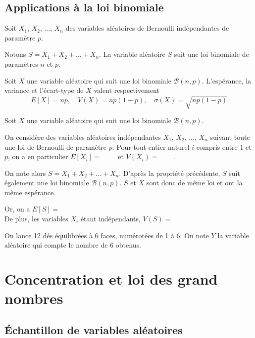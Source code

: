 \documentclass[11pt,fleqn, openany]{book} %
\begin{document}
\subsection{Applications à la loi binomiale}

\begin{proposition} Soit $X_1$, $X_2$, ..., $X_n$ des variables aléatoires de Bernoulli indépendantes de paramètre $p$. 

Notons $S=X_1+X_2+\ldots + X_n$. La variable aléatoire $S$ suit une loi binomiale de paramètres $n$ et $p$.\end{proposition}


\begin{proposition}Soit $X$ une variable aléatoire qui suit une loi binomiale $\mathcal{B}(n,p)$. L'espérance, la variance et l'écart-type de $X$ valent respectivement \[E[X]=np, \quad V(X)=np(1-p), \quad \sigma(X)=\sqrt{np(1-p)}\]
\vspace{-0,5cm}\end{proposition}

\begin{demonstration}Soit $X$ une variable aléatoire qui suit une loi binomiale $\mathcal{B}(n,p)$. 

On considère des variables aléatoires indépendantes $X_1$, $X_2$, ..., $X_n$  suivant toute une loi de Bernoulli de paramètre $p$. Pour tout entier naturel $i$ compris entre 1 et $p$, on a en particulier $E[X_i]=\qquad$ et $V(X_i)=\qquad$.

On note alors $S=X_1+X_2+\ldots +X_n$. D'après la propriété précédente, $S$ suit également une loi binomiale $\mathcal{B}(n,p)$. $S$ et $X$ sont donc de même loi et ont la même espérance.

Or, on a $E[S] = $\\ De plus, les variables $X_i$ étant indépendants, $V(S)=$\end{demonstration}

\begin{example}On lance 12 dés équilibrées à 6 faces, numérotées de 1 à 6. On note $Y$ la variable aléatoire qui compte le nombre de 6 obtenus. 

\vskip50pt
\end{example}



\section{Concentration et loi des grand nombres}
\subsection{Échantillon de variables aléatoires}
\end{document}
